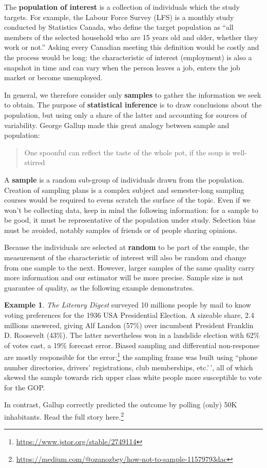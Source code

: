 \documentclass[
  11pt,
  letterpaper,
]{book}
\renewcommand{\href}[2]{#2\footnote{\url{#1}}}
\theoremstyle{definition}
\theoremstyle{definition}
\newtheorem{example}{Example}[chapter]
\theoremstyle{definition}
\theoremstyle{definition}
\theoremstyle{remark}
\begin{document}
The \textbf{population of interest} is a collection of individuals which the study targets. For example, the Labour Force Survey (LFS) is a monthly study conducted by Statistics Canada, who define the target population as ``all members of the selected household who are 15 years old and older, whether they work or not.'' Asking every Canadian meeting this definition would be costly and the process would be long: the characteristic of interest (employment) is also a snapshot in time and can vary when the person leaves a job, enters the job market or become unemployed.

In general, we therefore consider only \textbf{samples} to gather the information we seek to obtain. The purpose of \textbf{statistical inference} is to draw conclusions about the population, but using only a share of the latter and accounting for sources of variability. George Gallup made this great analogy between sample and population:

\begin{quote}
One spoonful can reflect the taste of the whole pot, if the soup is well-stirred
\end{quote}

A \textbf{sample} is a random sub-group of individuals drawn from the population. Creation of sampling plans is a complex subject and semester-long sampling courses would be required to evens scratch the surface of the topic. Even if we won't be collecting data, keep in mind the following information: for a sample to be good, it must be representative of the population under study. Selection bias must be avoided, notably samples of friends or of people sharing opinions.

Because the individuals are selected at \textbf{random} to be part of the sample, the measurement of the characteristic of interest will also be random and change from one sample to the next. However, larger samples of the same quality carry more information and our estimator will be more precise. Sample size is not guarantee of quality, as the following example demonstrates.

\begin{example}
\protect\hypertarget{exm:Galluppoll}{}\label{exm:Galluppoll}\emph{The Literary Digest} surveyed 10 millions people by mail to know voting preferences for the 1936 USA Presidential Election. A sizeable share, 2.4 millions answered, giving Alf Landon (57\%) over incumbent President Franklin D. Roosevelt (43\%). The latter nevertheless won in a landslide election with 62\% of votes cast, a 19\% forecast error. \href{https://www.jstor.org/stable/2749114}{Biased sampling and differential non-response are mostly responsible for the error:} the sampling frame was built using ``phone number directories, drivers' registrations, club memberships, etc.'\,', all of which skewed the sample towards rich upper class white people more susceptible to vote for the GOP.

In contrast, Gallup correctly predicted the outcome by polling (only) 50K inhabitants. \href{https://medium.com/@ozanozbey/how-not-to-sample-11579793dac}{Read the full story here.}
\end{example}
\end{document}
